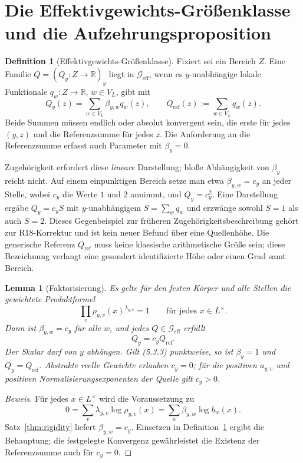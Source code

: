 \documentclass[11pt,a4paper]{article}
\newtheorem{lemma}[theorem]{Lemma}
\theoremstyle{definition}
\newtheorem{definition}[theorem]{Definition}
\theoremstyle{remark}
\newcommand{\Geff}{\mathcal{G}_{\mathrm{eff}}}
\begin{document}
\section{Die Effektivgewichts-Größenklasse und die
Aufzehrungsproposition}\label{sec:application}

\begin{definition}[Effektivgewichts-Größenklasse]\label{def:geff}
Fixiert sei ein Bereich $Z$. Eine Familie $Q=(Q_y:Z\to\mathbb R)_y$
liegt in $\Geff$, wenn es $y$-unabhängige lokale Funktionale
$q_w:Z\to\mathbb R$, $w\in V_L$, gibt mit
\[
Q_y(z)=\sum_{w\in V_L}\beta_{y,w}q_w(z),
\qquad Q_{\mathrm{ref}}(z):=\sum_{w\in V_L}q_w(z).
\]
Beide Summen müssen endlich oder absolut konvergent sein, die erste für
jedes $(y,z)$ und die Referenzsumme für jedes $z$.
Die Anforderung an die Referenzsumme erfasst auch Parameter mit $\beta_y=0$.
\end{definition}

Zugehörigkeit erfordert diese \emph{lineare} Darstellung; bloße Abhängigkeit
von $\beta_y$ reicht nicht. Auf einem einpunktigen Bereich setze man etwa
$\beta_{y,w}=c_y$ an jeder Stelle, wobei $c_y$ die Werte $1$ und $2$
annimmt, und $Q_y=c_y^2$. Eine Darstellung ergäbe $Q_y=c_y S$ mit
$y$-unabhängigem $S=\sum_wq_w$ und erzwänge sowohl $S=1$ als auch $S=2$.
Dieses Gegenbeispiel zur früheren Zugehörigkeitsbeschreibung gehört zur
R18-Korrektur und ist kein neuer Befund über eine Quellenhöhe.
Die generische Referenz $Q_{\mathrm{ref}}$ muss keine klassische
arithmetische Größe sein; diese Bezeichnung verlangt eine gesondert
identifizierte Höhe oder einen Grad samt Bereich.

\begin{lemma}[Faktorisierung]\label{lem:factorization}
Es gelte für den festen Körper und alle Stellen die gewichtete Produktformel
\[
\prod_v\rho_{y,v}(x)^{\lambda_{y,v}}=1
\qquad\text{für jedes }x\in L^\times.
\]
Dann ist $\beta_{y,w}=c_y$ für alle $w$, und jedes $Q\in\Geff$ erfüllt
\[
Q_y=c_yQ_{\mathrm{ref}}.
\]
Der Skalar darf von $y$ abhängen. Gilt (5.3.3) punktweise, so ist
$\beta_y=1$ und $Q_y=Q_{\mathrm{ref}}$.
Abstrakte reelle Gewichte erlauben $c_y=0$; für die positiven
$a_{y,v}$ und positiven Normalisierungsexponenten der Quelle gilt $c_y>0$.
\end{lemma}

\begin{proof}[Beweis]
Für jedes $x\in L^\times$ wird die Voraussetzung zu
\[
0=\sum_v\lambda_{y,v}\log\rho_{y,v}(x)
=\sum_w\beta_{y,w}\log b_w(x).
\]
Satz~\ref{thm:rigidity} liefert $\beta_{y,w}=c_y$.
Einsetzen in Definition~\ref{def:geff} ergibt die Behauptung; die festgelegte
Konvergenz gewährleistet die Existenz der Referenzsumme auch für $c_y=0$.
\end{proof}
\end{document}
